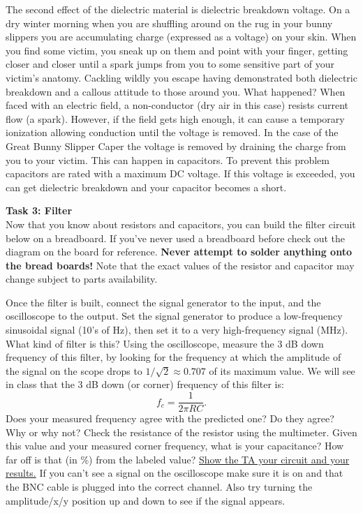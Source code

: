 \documentclass[12pt]{article}
\begin{document}
\begin{enumerate}[1.]
\par The second effect of the dielectric material is dielectric breakdown voltage. 
On a dry winter morning when you are shuffling around on the rug in your bunny slippers you are accumulating charge (expressed as a voltage) on your skin. 
When you find some victim, you sneak up on them and point with your finger, getting closer and closer until a spark jumps from you to some sensitive part of your victim's anatomy. 
Cackling wildly you escape having demonstrated both dielectric breakdown and a callous attitude to those around you. 
What happened? 
When faced with an electric field, a non-conductor (dry air in this case) resists current flow (a spark). 
However, if the field gets high enough, it can cause a temporary ionization allowing conduction until the voltage is removed. In the case of the Great Bunny Slipper Caper the voltage is removed by draining the charge from you to your victim. 
This can happen in capacitors. 
To prevent this problem capacitors are rated with a maximum DC voltage. 
If this voltage is exceeded, you can get dielectric breakdown and your capacitor becomes a short.

{\bf Task 3: Filter}\\
Now that you know about resistors and capacitors, you can build the filter circuit below on a breadboard.
If you've never used a breadboard before check out the diagram on the board for reference.
\textbf{Never attempt to solder anything onto the bread boards!}
Note that the exact values of the resistor and capacitor may change subject to parts availability.

\par Once the filter is built, connect the signal generator to the input, and the oscilloscope to the output. 
Set the signal generator to produce a low-frequency sinusoidal signal (10's of Hz), then set it to a very high-frequency signal (MHz). 
What kind of filter is this?
Using the oscilloscope, measure the 3 dB down frequency of this filter, 
by looking for the frequency at which the amplitude of the signal on the scope drops to $1/\sqrt{2} \approx 0.707$ of its maximum value.
We will see in class that the 3 dB down (or corner) frequency of this filter is:
\begin{equation}
f_c = \frac{1}{2\pi R C}.
\end{equation}
Does your measured frequency agree with the predicted one?
Do they agree? Why or why not?
Check the resistance of the resistor using the multimeter. 
Given this value and your measured corner frequency, what is your capacitance? 
How far off is that (in \%) from the labeled value?
\underline{Show the TA your circuit and your results.}
If you can't see a signal on the oscilloscope make sure it is on and that the BNC cable is plugged into the correct channel. Also try turning the amplitude/x/y position up and down to see if the signal appears.


\end{enumerate}
\end{document}
